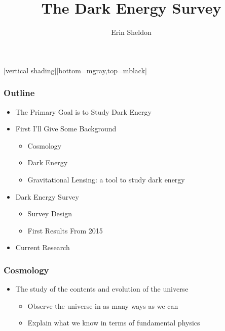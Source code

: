 \documentclass{beamer}
\title{The Dark Energy Survey}
\author{Erin Sheldon}
\institute{Brookhaven National Laboratory}
\begin{document}
\frame{\titlepage}

\frame
{
}


[vertical shading][bottom=mgray,top=mblack]

\frame
{
    \frametitle{Outline}

 
    \begin{itemize}

        \item The Primary Goal is to Study Dark Energy
        \item First I'll Give Some Background
        
        \begin{itemize}
            \item Cosmology
            \item Dark Energy
            \item Gravitational Lensing: a tool to study dark energy
        \end{itemize}

        \item Dark Energy Survey

        \begin{itemize}
            \item{Survey Design}
            \item{First Results From 2015}
        \end{itemize}

        \item Current Research

    \end{itemize}

}

\frame
{
    \frametitle{Cosmology}

 
    \begin{itemize}

        \item The study of the contents and evolution of the universe
        
        \begin{itemize}
            \item Observe the universe in as many
                ways as we can
            \item Explain what we know in terms of fundamental physics
        \end{itemize}

    \end{itemize}

}
\end{document}

